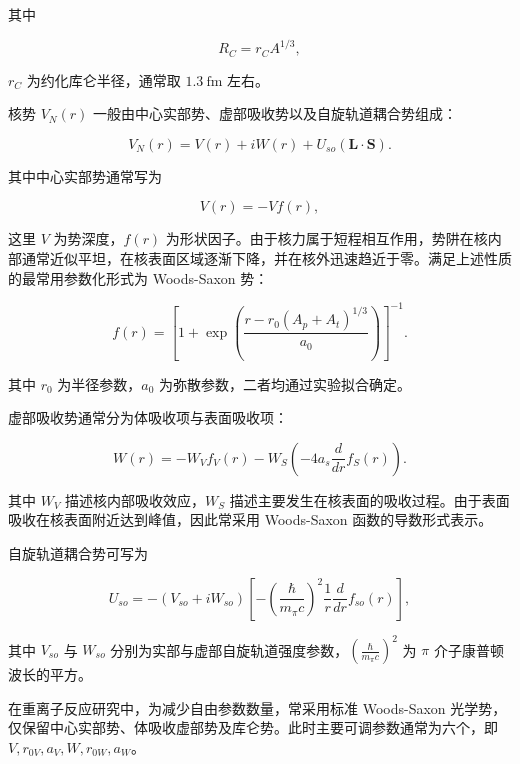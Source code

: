 其中

\begin{equation}
R_C=r_C A^{1/3},
\end{equation}

$r_C$ 为约化库仑半径，通常取 $1.3\ \mathrm{fm}$ 左右。

核势 $V_N(r)$ 一般由中心实部势、虚部吸收势以及自旋轨道耦合势组成：

\begin{equation}
V_N(r)=V(r)+iW(r)+U_{so}(\mathbf{L}\cdot\mathbf{S}).
\end{equation}

其中中心实部势通常写为

\begin{equation}
V(r)=-Vf(r),
\end{equation}

这里 $V$ 为势深度，$f(r)$ 为形状因子。由于核力属于短程相互作用，势阱在核内部通常近似平坦，在核表面区域逐渐下降，并在核外迅速趋近于零。满足上述性质的最常用参数化形式为 Woods-Saxon 势：

\begin{equation}
f(r)=\left[1+\exp\left(\frac{r-r_0(A_p+A_t)^{1/3}}{a_0}\right)\right]^{-1}.
\end{equation}

其中 $r_0$ 为半径参数，$a_0$ 为弥散参数，二者均通过实验拟合确定。

虚部吸收势通常分为体吸收项与表面吸收项：

\begin{equation}
W(r)=-W_V f_V(r)-W_S\left(-4a_s\frac{d}{dr}f_S(r)\right).
\end{equation}

其中 $W_V$ 描述核内部吸收效应，$W_S$ 描述主要发生在核表面的吸收过程。由于表面吸收在核表面附近达到峰值，因此常采用 Woods-Saxon 函数的导数形式表示。

自旋轨道耦合势可写为

\begin{equation}
U_{so}=-(V_{so}+iW_{so})
\left[-\left(\frac{\hbar}{m_\pi c}\right)^2
\frac{1}{r}\frac{d}{dr}f_{so}(r)\right],
\end{equation}

其中 $V_{so}$ 与 $W_{so}$ 分别为实部与虚部自旋轨道强度参数，$\left(\frac{\hbar}{m_\pi c}\right)^2$ 为 $\pi$ 介子康普顿波长的平方。

在重离子反应研究中，为减少自由参数数量，常采用标准 Woods-Saxon 光学势，仅保留中心实部势、体吸收虚部势及库仑势。此时主要可调参数通常为六个，即 $V,r_{0V},a_V,W,r_{0W},a_W$。

